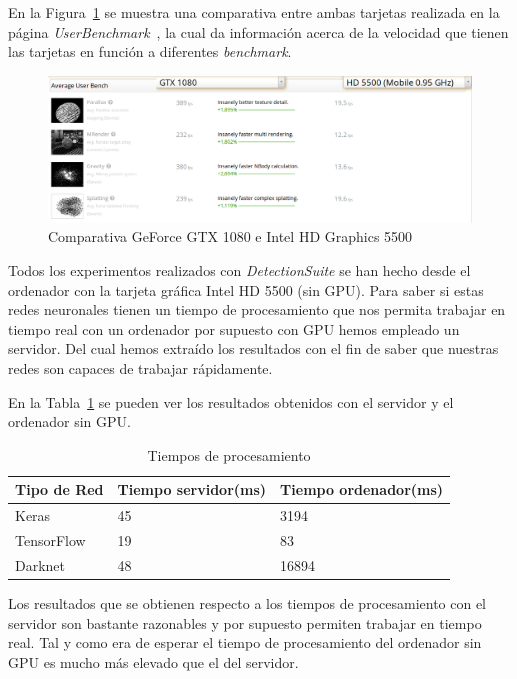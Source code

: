 En la Figura~\ref{fig.comparativa} se muestra una comparativa entre ambas tarjetas realizada en la página \textit{UserBenchmark}~\cite{benchmark}, la cual da información acerca de la velocidad que tienen las tarjetas en función a diferentes \textit{benchmark}.

\begin{figure}[H] 
\begin{center}
	\includegraphics[scale=0.4]{figures/Experimentos/comparativa.png}
   \caption{Comparativa GeForce GTX 1080 e Intel HD Graphics 5500}
	\label{fig.comparativa}
\end{center}
\end{figure}

Todos los experimentos realizados con \textit{DetectionSuite} se han hecho desde el ordenador con la tarjeta gráfica Intel HD 5500 (sin GPU). Para saber si estas redes neuronales tienen un tiempo de procesamiento que nos permita trabajar en tiempo real con un ordenador por supuesto con GPU hemos empleado un servidor. Del cual hemos extraído los resultados con el fin de saber que nuestras redes son capaces de trabajar rápidamente.


En la Tabla~\ref{tiempos} se pueden ver los resultados obtenidos con el servidor y el ordenador sin GPU.

\begin{table}[H]
\begin{center}
\begin{tabular}{|l|l|l|}
\hline
Tipo de Red & Tiempo servidor(ms) & Tiempo ordenador(ms)  \\ 
\hline \hline
Keras & 45 & 3194 \\ \hline
TensorFlow & 19 & 83 \\ \hline
Darknet & 48 & 16894 \\ \hline
\end{tabular}
\caption{Tiempos de procesamiento}
\label{tiempos}
\end{center}
\end{table}

Los resultados que se obtienen respecto a los tiempos de procesamiento con el servidor son bastante razonables y por supuesto permiten trabajar en tiempo real. Tal y como era de esperar el tiempo de procesamiento del ordenador sin GPU es mucho más elevado que el del servidor.

